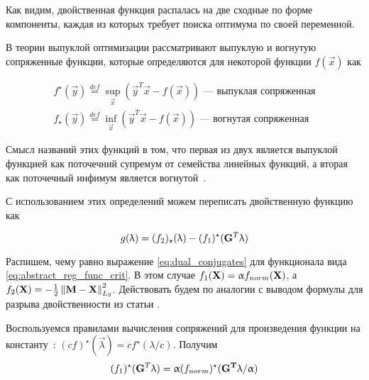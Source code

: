 Как видим, двойственная функция распалась на две сходные по форме компоненты,
каждая из которых требует поиска оптимума по своей переменной.


В теории выпуклой оптимизации рассматривают выпуклую и вогнутую сопряженные функции,
которые определяются для некоторой функции $f(\vec{x})$ как

\begin{gather}
    f^{\star}(\vec{y}) \stackrel{def}{=} \sup_{\vec{x}}(\vec{y}^T\vec{x} - f(\vec{x})) \text{ --- выпуклая сопряженная}\\
    f_{\star}(\vec{y}) \stackrel{def}{=} \inf_{\vec{x}}(\vec{y}^T\vec{x} - f(\vec{x})) \text{ --- вогнутая сопряженная}
\end{gather}

Смысл названий этих функций в том, что первая из двух является выпуклой
функцией как поточечний супремум от семейства линейных функций, а вторая как
поточечный инфимум является вогнутой~\cite{boyd_2004}.

С использованием этих определений можем переписать двойственную функцию как

\begin{equation}
    g(\mathbf{\uplambda}) =
    (f_2)_{\star}(\mathbf{\uplambda}) - (f_1)^{\star}(\mathbf{G}^T\mathbf{\uplambda})
    \label{eq:dual_conjugates}
\end{equation}

Распишем, чему равно выражение \ref{eq:dual_conjugates} для функционала вида \ref{eq:abstract_reg_func_crit}.
В этом случае $f_1(\mathbf{X}) = \upalpha f_{norm}(\mathbf{X})$, а $f_2(\mathbf{X}) = - \frac{1}{2}\left\lVert\mathbf{M} - \mathbf{X}\right\rVert_{L_2}^2$.
Действовать будем по аналогии с выводом формулы для разрыва двойственности из статьи \cite{gramfort_2012}.

Воспользуемся правилами вычисления сопряжений для произведения функции на константу~\cite{Boyd}: $(c f)^{\star}(\vec{\lambda}) = c f^{\star}(\lambda / c)$.
Получим
\begin{equation}
    (f_1)^{\star}(\mathbf{G}^T\mathbf{\uplambda}) =
    \upalpha (f_{norm})^{\star}(\mathbf{G^T\uplambda}/\upalpha)
\end{equation}

